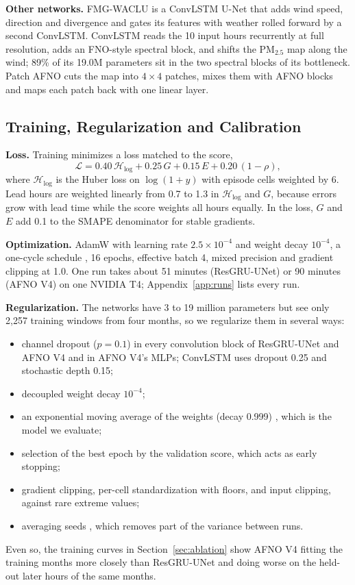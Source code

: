 \documentclass[journal]{IEEEtran}
\newcommand{\PM}{PM$_{2.5}$}
\begin{document}
\textbf{Other networks.} FMG-WACLU is a ConvLSTM U-Net that adds wind speed, direction and divergence and gates its features with weather rolled forward by a second ConvLSTM. ConvLSTM reads the 10 input hours recurrently at full resolution, adds an FNO-style spectral block, and shifts the \PM{} map along the wind; 89\% of its 19.0M parameters sit in the two spectral blocks of its bottleneck. Patch AFNO cuts the map into $4\times4$ patches, mixes them with AFNO blocks and maps each patch back with one linear layer.

\subsection{Training, Regularization and Calibration}
\label{sec:training}
\textbf{Loss.} Training minimizes a loss matched to the score,
\begin{equation}
\mathcal{L} = 0.40\,\mathcal{H}_{\log} + 0.25\,G + 0.15\,E + 0.20\,(1-\rho),
\end{equation}
where $\mathcal{H}_{\log}$ is the Huber loss on $\log(1+y)$ with episode cells weighted by 6. Lead hours are weighted linearly from 0.7 to 1.3 in $\mathcal{H}_{\log}$ and $G$, because errors grow with lead time while the score weights all hours equally. In the loss, $G$ and $E$ add 0.1 to the SMAPE denominator for stable gradients.

\textbf{Optimization.} AdamW \cite{loshchilov2019} with learning rate $2.5\times10^{-4}$ and weight decay $10^{-4}$, a one-cycle schedule \cite{smith2019}, 16 epochs, effective batch 4, mixed precision and gradient clipping at 1.0. One run takes about 51 minutes (ResGRU-UNet) or 90 minutes (AFNO V4) on one NVIDIA T4; Appendix~\ref{app:runs} lists every run.

\textbf{Regularization.} The networks have 3 to 19 million parameters but see only 2{,}257 training windows from four months, so we regularize them in several ways:
\begin{itemize}
\item channel dropout ($p=0.1$) in every convolution block of ResGRU-UNet and AFNO V4 and in AFNO V4's MLPs; ConvLSTM uses dropout 0.25 and stochastic depth 0.15;
\item decoupled weight decay $10^{-4}$;
\item an exponential moving average of the weights (decay 0.999) \cite{polyak1992}, which is the model we evaluate;
\item selection of the best epoch by the validation score, which acts as early stopping;
\item gradient clipping, per-cell standardization with floors, and input clipping, against rare extreme values;
\item averaging seeds \cite{lakshminarayanan2017}, which removes part of the variance between runs.
\end{itemize}
Even so, the training curves in Section~\ref{sec:ablation} show AFNO V4 fitting the training months more closely than ResGRU-UNet and doing worse on the held-out later hours of the same months.
\end{document}
